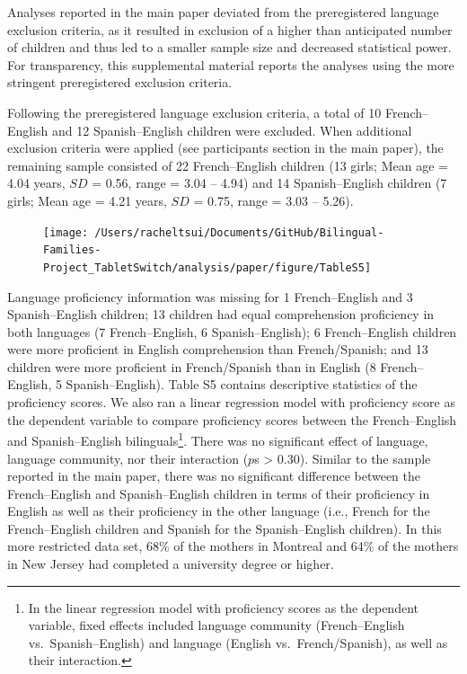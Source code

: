 \documentclass[
  man,floatsintext]{apa7}
\begin{document}
Analyses reported in the main paper deviated from the preregistered language exclusion criteria, as it resulted in exclusion of a higher than anticipated number of children and thus led to a smaller sample size and decreased statistical power. For transparency, this supplemental material reports the analyses using the more stringent preregistered exclusion criteria.

Following the preregistered language exclusion criteria, a total of 10 French--English and 12 Spanish--English children were excluded. When additional exclusion criteria were applied (see participants section in the main paper), the remaining sample consisted of 22 French--English children (13 girls; Mean age = 4.04 years, \(SD\) = 0.56, range = 3.04 -- 4.94) and 14 Spanish--English children (7 girls; Mean age = 4.21 years, \(SD\) = 0.75, range = 3.03 -- 5.26).

\begin{figure}[H]

{\centering \texttt{[image: /Users/racheltsui/Documents/GitHub/Bilingual-Families-Project\_TabletSwitch/analysis/paper/figure/TableS5]} 

}

\end{figure}

Language proficiency information was missing for 1 French--English and 3 Spanish--English children; 13 children had equal comprehension proficiency in both languages (7 French--English, 6 Spanish--English); 6 French--English children were more proficient in English comprehension than French/Spanish; and 13 children were more proficient in French/Spanish than in English (8 French--English, 5 Spanish--English). Table S5 contains descriptive statistics of the proficiency scores. We also ran a linear regression model with proficiency score as the dependent variable to compare proficiency scores between the French--English and Spanish--English bilinguals\footnote{In the linear regression model with proficiency scores as the dependent variable, fixed effects included language community (French--English vs.~Spanish--English) and language (English vs.~French/Spanish), as well as their interaction.}. There was no significant effect of language, language community, nor their interaction (\(p\)s \textgreater{} 0.30). Similar to the sample reported in the main paper, there was no significant difference between the French--English and Spanish--English children in terms of their proficiency in English as well as their proficiency in the other language (i.e., French for the French--English children and Spanish for the Spanish--English children). In this more restricted data set, 68\% of the mothers in Montreal and 64\% of the mothers in New Jersey had completed a university degree or higher.
\end{document}
